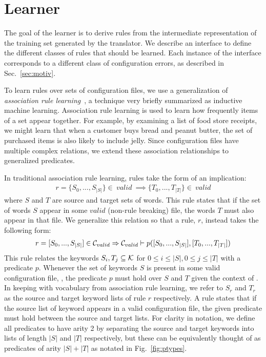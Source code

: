 \section{Learner}
\label{sec-learn}

The goal of the learner is to derive rules from the intermediate representation of the training set generated by the translator.
We describe an interface to define the different classes of rules that should be learned.
Each instance of the interface corresponds to a different class of configuration errors, as described in Sec.~\ref{sec:motiv}.

To learn rules over sets of configuration files, we use a generalization of \textit{association rule learning}~\cite{agrawal1993mining}, a technique very briefly summarized as inductive machine learning.
Association rule learning is used to learn how frequently items of a set appear together.
For example, by examining a list of food store receipts, we might learn that when a customer buys bread and peanut butter, the set of purchased items is also likely to include jelly.
Since configuration files have multiple complex relations, we extend these association relationships to generalized predicates.

In traditional association rule learning, rules take the form of an implication:
\begin{align*}
r = \{S_0,...,S_{|S|}\} \in\ valid\ \implies \{T_0,...,T_{|T|}\} \in\ valid
\end{align*}
where $S$ and $T$ are source and target sets of words.
This rule states that if the set of words $S$ appear in some $valid$ (\ie non-rule breaking) file, the words $T$ must also appear in that file.
We generalize this relation so that a rule, $r$, instead takes the following form:
%
\begin{align*}
r = [S_0,...,S_{|S|}] \in \mathcal{C}_{valid} \Rightarrow \mathcal{C}_{valid} \vdash p([S_0,...,S_{|S|}],[T_0,...,T_{|T|}])
\end{align*}
%
This rule relates the keywords $S_i,T_j \subseteq \mathcal{K}$ for $0 \leq i \leq |S|, 0 \leq j \leq |T|$ with a predicate $p$.
Whenever the set of keywords $S$ is present in some valid configuration file, \validSet, the predicate $p$ must hold over $S$ and $T$ given the context of \validSet.
In keeping with vocabulary from association rule learning, we refer to $S_r$ and $T_r$ as the source and target keyword lists of rule $r$ respectively.
A rule states that if the source list of keyword appears in a valid configuration file, the given predicate must hold between the source and target lists.
For clarity in notation, we define all predicates to have arity 2 by separating the source and target keywords into lists of length $|S|$ and $|T|$ respectively,
   but these can be equivalently thought of as predicates of arity $|S|+|T|$ as notated in Fig.~\ref{fig:ptypes}.

